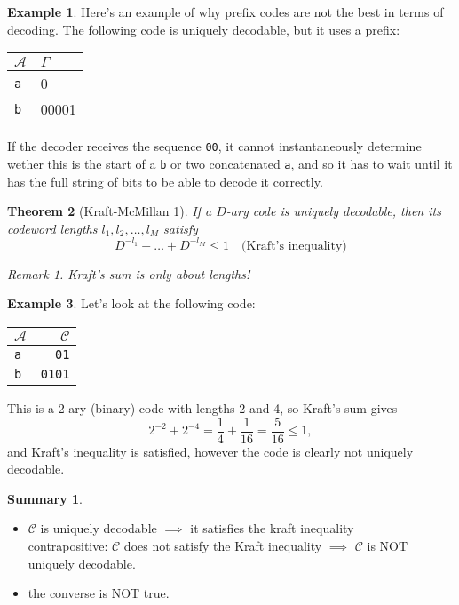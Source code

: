 \documentclass{report}
\theoremstyle{plain}
\newtheorem{thm}{Theorem}
\theoremstyle{definition}
\newtheorem{exmp}[thm]{Example}
\newtheorem*{summary}{Summary}
\theoremstyle{remark}
\newtheorem*{remark}{Remark}
\begin{document}
\begin{exmp} Here's an example of why prefix codes are not the best in terms of decoding. The following code is uniquely decodable, but it uses a prefix:
\begin{center}
	\begin{tabular}{l | l} 
		$\mathcal A$ & $\Gamma$ \\ \hline
		\texttt a & 0 \\
		\texttt b & 00001
	\end{tabular}
\end{center}
If the decoder receives the sequence \texttt{00}, it cannot instantaneously determine wether this is the start of a \texttt{b} or two concatenated \texttt{a}, and so it has to wait until it has the full string of bits to be able to decode it correctly.
\end{exmp}

\begin{thm}[Kraft-McMillan 1]
	If a $D$-ary code is uniquely decodable, then its codeword lengths $l_1, l_2, \ldots, l_M$ satisfy
\begin{equation}
	D^{-l_1} + \dots + D^{-l_M} \leq 1 \quad \text{(Kraft's inequality)}
\end{equation}
\begin{remark}
Kraft's sum is only about lengths!
\end{remark}
\end{thm}

\begin{exmp} Let's look at the following code:
\begin{center}
	\begin{tabular}{l | r}
	$\mathcal A$ & $\mathcal C$ \\ \hline
	\texttt a & \texttt{01} \\
	\texttt b & \texttt{0101}	
	\end{tabular}
\end{center}
	This is a 2-ary (binary) code with lengths 2 and 4, so Kraft's sum gives
	\begin{equation*}
		2^{-2} + 2^{-4} = \frac14 + \frac{1}{16} = \frac{5}{16} \leq 1,
	\end{equation*}
	and Kraft's inequality is satisfied, however the code is clearly \ul{not} uniquely decodable.
\end{exmp}


\begin{summary}
\begin{itemize}
	\item $\mathcal C$ is uniquely decodable $\implies$ it satisfies the kraft inequality \\
			contrapositive: $\mathcal C$ does not satisfy the Kraft inequality $\implies$ $\mathcal C$ is NOT uniquely decodable.
	\item the converse is NOT true.
\end{itemize}
\end{summary}
\end{document}
